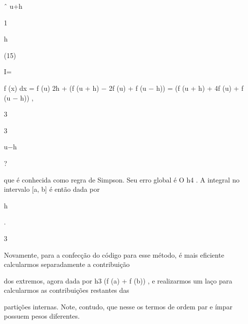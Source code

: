 \documentclass[a4paper,portrait,12pt]{article}
\begin{document}
\begin{flushleft}
ˆ u+h
\end{flushleft}


1


\begin{flushleft}
h
\end{flushleft}


(15)


\begin{flushleft}
I=
\end{flushleft}


\begin{flushleft}
f (x) dx = f (u) 2h + (f (u + h) $-$ 2f (u) + f (u $-$ h)) = (f (u + h) + 4f (u) + f (u $-$ h)) ,
\end{flushleft}


3


3


\begin{flushleft}
u$-$h
\end{flushleft}


?


\begin{flushleft}
que \'{e} conhecida como regra de Simpson. Seu erro global \'{e} O h4 . A integral no intervalo [a, b] \'{e} ent\~{a}o dada por
\end{flushleft}


\begin{flushleft}
h
\end{flushleft}


\begin{flushleft}
[f (a) + 4f (a + h) + 2f (a + 2h) + 4f (a + 3h) + 2f (a + 4h) . . . + f (b)] .
\end{flushleft}


3


\begin{flushleft}
Novamente, para a confec\c{c}\~{a}o do c\'{o}digo para esse m\'{e}todo, \'{e} mais eficiente calcularmos separadamente a contribui\c{c}\~{a}o
\end{flushleft}


\begin{flushleft}
dos extremos, agora dada por h3 (f (a) + f (b)) , e realizarmos um la\c{c}o para calcularmos as contribui\c{c}\~{o}es restantes das
\end{flushleft}


\begin{flushleft}
parti\c{c}\~{o}es internas. Note, contudo, que nesse os termos de ordem par e \'{i}mpar possuem pesos diferentes.
\end{flushleft}
\end{document}
